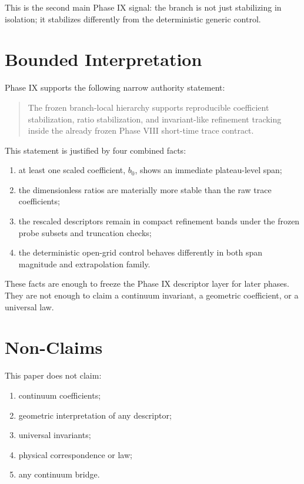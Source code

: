 \documentclass[11pt]{article}
\begin{document}
This is the second main Phase IX signal: the branch is not just stabilizing in isolation; it stabilizes differently from the deterministic generic control.

\section{Bounded Interpretation}

Phase IX supports the following narrow authority statement:
\begin{quote}
The frozen branch-local hierarchy supports reproducible coefficient stabilization, ratio stabilization, and invariant-like refinement tracking inside the already frozen Phase VIII short-time trace contract.
\end{quote}

This statement is justified by four combined facts:
\begin{enumerate}
\item at least one scaled coefficient, $b_0$, shows an immediate plateau-level span;
\item the dimensionless ratios are materially more stable than the raw trace coefficients;
\item the rescaled descriptors remain in compact refinement bands under the frozen probe subsets and truncation checks;
\item the deterministic open-grid control behaves differently in both span magnitude and extrapolation family.
\end{enumerate}

These facts are enough to freeze the Phase IX descriptor layer for later phases. They are not enough to claim a continuum invariant, a geometric coefficient, or a universal law.

\section{Non-Claims}

This paper does not claim:
\begin{enumerate}
\item continuum coefficients;
\item geometric interpretation of any descriptor;
\item universal invariants;
\item physical correspondence or law;
\item any continuum bridge.
\end{enumerate}
\end{document}
